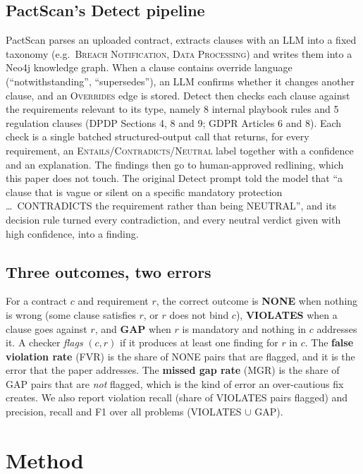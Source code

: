\documentclass[conference]{IEEEtran}
\begin{document}
\subsection{PactScan's Detect pipeline}
PactScan parses an uploaded contract, extracts clauses with an LLM into a fixed taxonomy (e.g.\ \textsc{Breach Notification}, \textsc{Data Processing}) and writes them into a Neo4j knowledge graph. When a clause contains override language (``notwithstanding'', ``supersedes''), an LLM confirms whether it changes another clause, and an \textsc{Overrides} edge is stored. Detect then checks each clause against the requirements relevant to its type, namely 8 internal playbook rules and 5 regulation clauses (DPDP Sections 4, 8 and 9; GDPR Articles 6 and 8). Each check is a single batched structured-output call that returns, for every requirement, an \textsc{Entails}/\textsc{Contradicts}/\textsc{Neutral} label together with a confidence and an explanation. The findings then go to human-approved redlining, which this paper does not touch. The original Detect prompt told the model that ``a clause that is vague or silent on a specific mandatory protection \dots\ CONTRADICTS the requirement rather than being NEUTRAL'', and its decision rule turned every contradiction, and every neutral verdict given with high confidence, into a finding.

\subsection{Three outcomes, two errors}
For a contract $c$ and requirement $r$, the correct outcome is \textbf{NONE} when nothing is wrong (some clause satisfies $r$, or $r$ does not bind $c$), \textbf{VIOLATES} when a clause goes against $r$, and \textbf{GAP} when $r$ is mandatory and nothing in $c$ addresses it. A checker \emph{flags} $(c,r)$ if it produces at least one finding for $r$ in $c$. The \textbf{false violation rate} (FVR) is the share of NONE pairs that are flagged, and it is the error that the paper addresses. The \textbf{missed gap rate} (MGR) is the share of GAP pairs that are \emph{not} flagged, which is the kind of error an over-cautious fix creates. We also report violation recall (share of VIOLATES pairs flagged) and precision, recall and F1 over all problems (VIOLATES $\cup$ GAP).

\section{Method}
\end{document}
